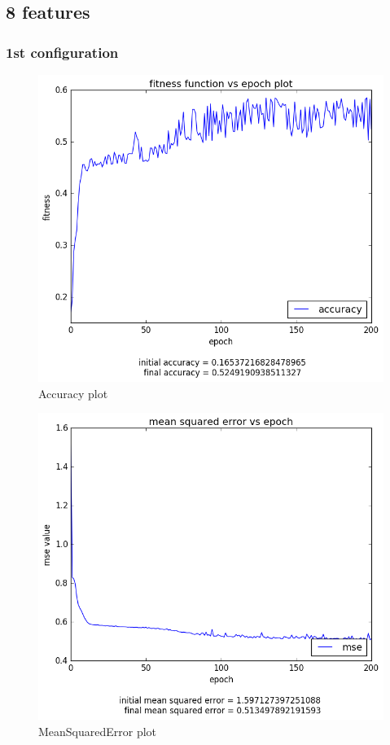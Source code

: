 \documentclass[12pt,a4paper]{article}
\begin{document}
\subsection{8 features}
\subsubsection{1st configuration}
\begin{figure}[H]
\centering
\includegraphics[scale=0.4]{img/8_acc.png}
\caption{Accuracy plot}
\end{figure}
\begin{figure}[H]
\centering
\includegraphics[scale=0.4]{img/8_mse.png}
\caption{MeanSquaredError plot}
\end{figure}
\end{document}
